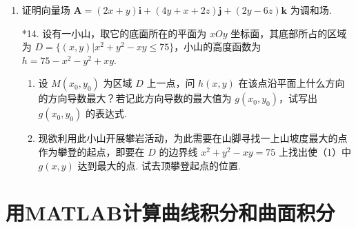 \begin{enumerate}
    \item 证明向量场 $\boldsymbol{A}=(2x+y)\boldsymbol{i}+(4y+x+2z)\boldsymbol{j}+(2y-6z)\boldsymbol{k}$ 为调和场.
    
    \item[*14.] 设有一小山，取它的底面所在的平面为 $xOy$ 坐标面，其底部所占的区域为 $D=\{(x, y)|x^2+y^2-xy\leqslant75\}$，小山的高度函数为 $h=75-x^2-y^2+xy$.
    \begin{enumerate}[(1)]\setlength{\itemsep}{5pt}\setlength{\topsep}{15pt}
        \item 设 $M(x_0, y_0)$ 为区域 $D$ 上一点，问 $h(x, y)$ 在该点沿平面上什么方向的方向导数最大？若记此方向导数的最大值为 $g(x_0, y_0)$，试写出 $g(x_0, y_0)$ 的表达式.
        \item 现欲利用此小山开展攀岩活动，为此需要在山脚寻找一上山坡度最大的点作为攀登的起点，即要在 $D$ 的边界线 $x^2+y^2-xy=75$  上找出使（1）中 $g(x, y)$ 达到最大的点. 试去顶攀登起点的位置.
    \end{enumerate}



    





    
\end{enumerate}

\section{用MATLAB计算曲线积分和曲面积分}